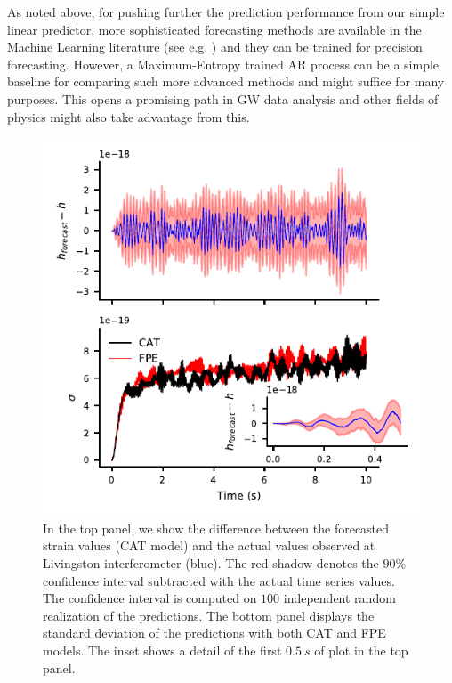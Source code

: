 \documentclass[twocolumn,showpacs,preprintnumbers,nofootinbib,prd,
superscriptaddress,10pt]{revtex4-1}
\begin{document}
As noted above, for pushing further the prediction performance from our simple linear predictor, more sophisticated forecasting methods are available in the Machine Learning literature (see e.g. \cite{LSTM_article, oord2016wavenet}) and they can be trained for precision forecasting. However, a Maximum-Entropy trained AR process can be a simple baseline for comparing such more advanced methods and might suffice for many purposes.
This opens a promising path in GW data analysis and other fields of physics might also take advantage from this.

\begin{figure}
	\caption{In the top panel, we show the difference between the forecasted strain values (CAT model) and the actual values observed at Livingston interferometer (blue). The red shadow denotes the $90\%$ confidence interval subtracted with the actual time series values. The confidence interval is computed on  $100$ independent random realization of the predictions.
	The bottom panel displays the standard deviation of the predictions with both CAT and FPE models. The inset shows a detail of the first $\SI{0.5}{s}$ of plot in the top panel.
	}
	\label{fig:LIGO_forecast}
	\includegraphics{Images/forecast_LIGO/forecast_accuracy.pdf}
\end{figure}
\end{document}
